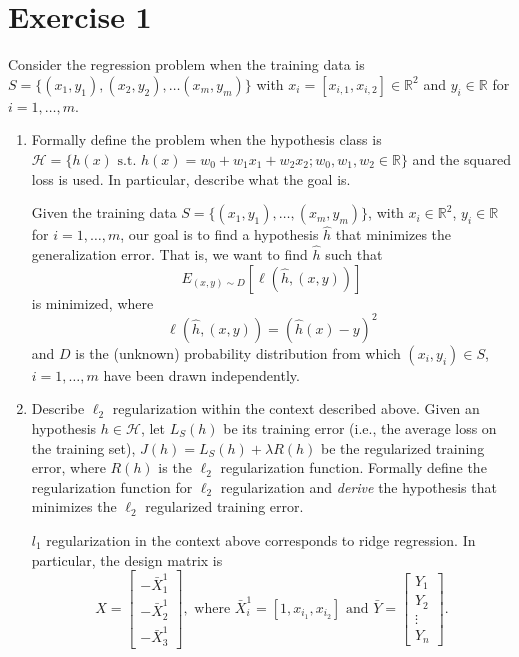 \documentclass[a4paper,11pt,oneside]{book}
\begin{document}
\clearpage
\section{Exercise 1}
Consider the regression problem when the training data is \( S = \{(x_1, y_1), (x_2, y_2), \ldots (x_m, y_m)\} \) with \( x_i = [x_{i,1}, x_{i,2}] \in \mathbb{R}^2 \) and \( y_i \in \mathbb{R} \) for \( i = 1, \ldots, m \).

\begin{enumerate}
    \item Formally define the problem when the hypothesis class is \( \mathcal{H} = \{h(x) \text{ s.t. } h(x) = w_0 + w_1 x_1 + w_2 x_2; w_0, w_1, w_2 \in \mathbb{R}\} \) and the squared loss is used. In particular, describe what the goal is.
        \begin{solution}
            Given the training data \( S = \{ (x_1, y_1), \ldots, (x_m, y_m) \} \), with \( x_i \in \mathbb{R}^2 \), \( y_i \in \mathbb{R} \) for \( i = 1, \ldots, m \), our goal is to find a hypothesis \( \hat{h} \) that minimizes the generalization error. That is, we want to find \( \hat{h} \) such that  
            \[
            E_{(x, y) \sim D} [\ell(\hat{h}, (x, y))]
            \]
            is minimized, where  
            \[
            \ell(\hat{h}, (x, y)) = (\hat{h}(x) - y)^2
            \]
            and \( D \) is the (unknown) probability distribution from which \( (x_i, y_i) \in S \), \( i = 1, \ldots, m \) have been drawn independently.
        \end{solution}
    \clearpage
    \item Describe \( \ell_2 \) regularization within the context described above. Given an hypothesis \( h \in \mathcal{H} \), let \( L_S(h) \) be its training error (i.e., the average loss on the training set), \( J(h) = L_S(h) + \lambda R(h) \) be the regularized training error, where \( R(h) \) is the \( \ell_2 \) regularization function. Formally define the regularization function for \( \ell_2 \) regularization and \textit{derive} the hypothesis that minimizes the \( \ell_2 \) regularized training error.
        \begin{solution}
            \( l_1 \) regularization in the context above corresponds to ridge regression. In particular, the design matrix is  
            \[
            X = \begin{bmatrix} 
            -\bar{X}_1^1 \\ 
            -\bar{X}_2^1 \\ 
            -\bar{X}_3^1 
            \end{bmatrix}, 
            \text{ where } \bar{X}_i^1 = [1, x_{i_1}, x_{i_2}] \text{ and } \bar{Y} = \begin{bmatrix} 
            Y_1 \\ 
            Y_2 \\ 
            \vdots \\ 
            Y_n 
            \end{bmatrix}. 
            \]  
        

\end{solution}
\end{enumerate}
\end{document}
